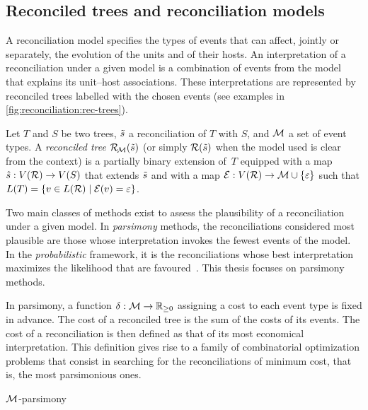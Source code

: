 \subsection{Reconciled trees and reconciliation models}\label{sec:reconciliation:bilateral:model}

A reconciliation model specifies the types of events that can affect, jointly or separately, the evolution of the units and of their hosts.
An interpretation of a reconciliation under a given model is a combination of events from the model that explains its unit--host associations.
These interpretations are represented by reconciled trees labelled with the chosen events (see examples in \cref{fig:reconciliation:rec-trees}).

\begin{definition}\label{def:reconciliation:rectree}
    Let \(T\) and \(S\) be two trees, \(\tilde{s}\) a reconciliation of \(T\) with \(S\), and \(\mathcal{M}\) a set of event types.
    A \emph{reconciled tree} \(\mathcal{R}_{\!\mathcal{M}}(\tilde{s})\) (or simply \(\mathcal{R}(\tilde{s})\) when the model used is clear from the context) is a partially binary extension of~\(T\) equipped with a map \(\hat{s} : V(\mathcal{R}) \rightarrow V(S)\) that extends \(\tilde{s}\) and with a map \(\mathcal{E} : V(\mathcal{R}) \rightarrow \mathcal{M} \cup \{\varepsilon\}\)
    such that \(L(T) = \{ v \in L(\mathcal{R}) \mid \mathcal{E}(v) = \varepsilon \}\).
\end{definition}

Two main classes of methods exist to assess the plausibility of a reconciliation under a given model.
In \emph{parsimony} methods, the reconciliations considered most plausible are those whose interpretation invokes the fewest events of the model.
In the \emph{probabilistic} framework, it is the reconciliations whose best interpretation maximizes the likelihood that are favoured~\parencite{Doyon2011ModelsAlgorithmsPrograms}.
This thesis focuses on parsimony methods.

In parsimony, a function \(\delta\kern.1pt : \mathcal{M} \rightarrow \mathbb{R}_{\ge 0}\) assigning a cost to each event type is fixed in advance.
The cost of a reconciled tree is the sum of the costs of its events.
The cost of a reconciliation is then defined as that of its most economical interpretation.
This definition gives rise to a family of combinatorial optimization problems that consist in searching for the reconciliations of minimum cost, that is, the most parsimonious ones.

\begin{problem}{\(\mathcal{M}\)-parsimony\label{prob:reconciliation:parsimony}}
\end{problem}

